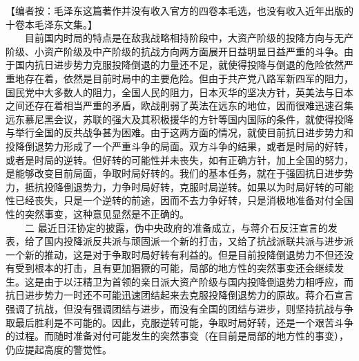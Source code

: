 \documentclass[cn,11pt,chinese]{elegantbook}
\begin{document}
【编者按：毛泽东这篇著作并没有收入官方的四卷本毛选，也没有收入近年出版的十卷本毛泽东文集。】\\
　　目前国内时局的特点是在敌我战略相持阶段中，大资产阶级的投降方向与无产阶级、小资产阶级及中产阶级的抗战方向两方面展开日益明显日益严重的斗争。由于国内抗日进步势力克服投降倒退的力量还不足，就使得投降与倒退的危险依然严重地存在着，依然是目前时局中的主要危险。但由于共产党八路军新四军的阻力，国民党中大多数人的阻力，全国人民的阻力，日本灭华的坚决方针，英美法与日本之间还存在着相当严重的矛盾，欧战削弱了英法在远东的地位，因而很难迅速召集远东慕尼黑会议，苏联的强大及其积极援华的方针等国内国际的条件，就使得投降与举行全国的反共战争甚为困难。由于这两方面的情况，就使目前抗日进步势力和投降倒退势力形成了一个严重斗争的局面。双方斗争的结果，或者是时局的好转，或者是时局的逆转。但好转的可能性并未丧失，如有正确方针，加上全国的努力，是能够改变目前局面，争取时局好转的。我们的基本任务，就在于强固抗日进步势力，抵抗投降倒退势力，力争时局好转，克服时局逆转。如果以为时局好转的可能性已经丧失，只是一个逆转的前途，因而不去力争好转，只是消极地准备对付全国性的突然事变，这种意见显然是不正确的。\\
　　二 最近日汪协定的披露，伪中央政府的准备成立，与蒋介石反汪宣言的发表，给了国内投降派反共派与顽固派一个新的打击，又给了抗战派联共派与进步派一个新的推动，这是对于争取时局好转有利益的。但是目前投降倒退势力不但还没有受到根本的打击，且有更加猖獗的可能，局部的地方性的突然事变还会继续发生。这是由于以汪精卫为首领的亲日派大资产阶级与国内投降倒退势力相呼应，而抗日进步势力一时还不可能迅速团结起来去克服投降倒退势力的原故。蒋介石宣言强调了抗战，但没有强调团结与进步，而没有全国的团结与进步，则坚持抗战与争取最后胜利是不可能的。因此，克服逆转可能，争取时局好转，还是一个艰苦斗争的过程。而随时准备对付可能发生的突然事变（在目前是局部的地方性的事变），仍应提起高度的警觉性。\\
\end{document}
